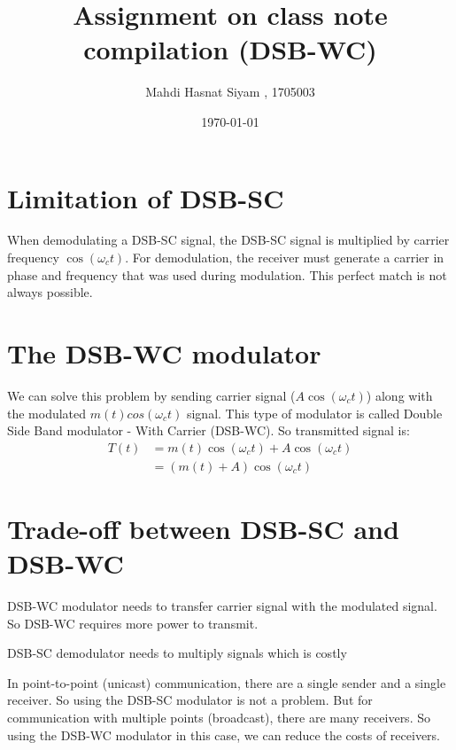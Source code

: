\documentclass{article}
\author{Mahdi Hasnat Siyam , 1705003}
\date{\today}
\title{Assignment on class note compilation (DSB-WC)}
\begin{document}
\maketitle

\section{Limitation of DSB-SC}
When demodulating a DSB-SC signal, the DSB-SC signal is multiplied by carrier frequency $\cos\left(\omega_ct\right)$. 
For demodulation, the receiver must generate a carrier in phase and frequency that was used during modulation.
This perfect match is not always possible. 

\section{The DSB-WC modulator}
We can solve this problem by sending carrier signal ($A\cos\left(\omega_ct\right)$) along with the modulated 
$m\left(t\right)cos\left(\omega_ct\right)$ signal. This type of modulator is called Double Side Band modulator - With Carrier (DSB-WC).
So transmitted signal is:
\begin{equation}
	\begin{split}
		T(t) &= m(t)\cos\left(\omega_ct\right) + A\cos\left(\omega_ct\right)
		\\
		&= \left(m(t)+A\right)\cos\left(\omega_ct\right)
	\end{split}
	\label{dsb-wc-equation}
\end{equation}
\section{Trade-off between DSB-SC and DSB-WC}


DSB-WC modulator needs to transfer carrier signal with the modulated signal.
So DSB-WC requires more power to transmit.

\smallskip
DSB-SC demodulator needs to multiply signals which is costly

\smallskip
In point-to-point (unicast) communication, there are a single sender and a single receiver. 
So using the DSB-SC modulator is not a problem.
But for communication with multiple points (broadcast), there are many receivers.
So using the DSB-WC modulator in this case, we can reduce the costs of receivers.
\smallskip
\begin{ExerciseList}
\end{ExerciseList}
\end{document}
